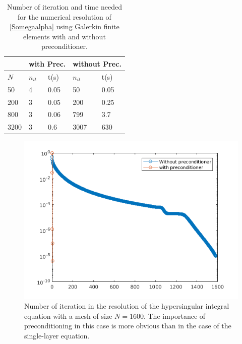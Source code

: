\documentclass[a4paper]{article}
\begin{document}
\begin{table}[H]
	\begin{center}
		\begin{tabular}{|| m{4em} | m{4em} | m{4em} | m{4em} | m{4em}||} 
			\hline
			\multicolumn{1}{||c|}{ }&
			\multicolumn{2}{c|}{with Prec.}&\multicolumn{2}{c||}{without Prec.}\\
			\hline
			$N$ & $n_{it}$& t(s) & $n_{it}$ & t(s)\\
			\hline\hline
			50 & 4 & 0.05 & 50 & 0.05\\
			\hline
			200 & 3 & 0.05 & 200 & 0.25\\
			\hline
			800 & 3 & 0.06 & 799 & 3.7 \\
			\hline
			3200 & 3 & 0.6 & 3007 & 630\\
			\hline
		\end{tabular}
	\end{center}
	\caption{Number of iteration and time needed for the numerical resolution of \eqref{Somegaalpha} using Galerkin finite elements with and without preconditioner.}
	\label{TableNitTimeLaplaceNeumann}
\end{table}
\begin{figure}[H]
	\centering
	\includegraphics[scale=0.7]{figs/PrecondNeumannLaplaceSeg.png}
	\caption{Number of iteration in the resolution of the hypersingular  integral equation with a mesh of size $N = 1600$. The importance of preconditioning in this case is more obvious than in the case of the single-layer equation.}
	\label{FigureNitLaplaceNeumann}
\end{figure}
\end{document}
